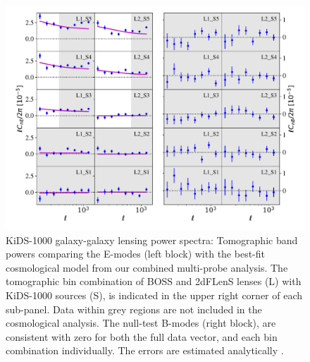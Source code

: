 \begin{figure}
        \includegraphics[width=\textwidth]{Data_Plots/Pgk/Pgk_K1000_2Dbins_v2_goldclasses_Flag_SOM_Fid_A.pdf}
        \caption{KiDS-1000 galaxy-galaxy lensing power spectra:
          Tomographic band powers comparing the E-modes (left block)
          with the best-fit
          cosmological model from our combined multi-probe analysis.  The tomographic 
        bin combination of BOSS and 2dFLenS lenses (L) with KiDS-1000
        sources (S), is indicated in the upper right corner of each
        sub-panel.  Data within grey regions are not included in the cosmological analysis.
        The null-test B-modes (right block), are
      consistent with zero for both the full data vector, and each
     bin combination individually.  The errors are estimated analytically \citep{joachimi/etal:inprep}.}
        \label{fig:Pgk}
\end{figure}



